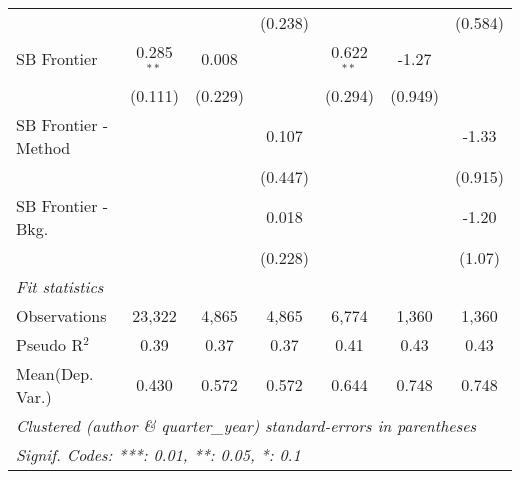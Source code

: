\begin{tabular}{lcccccc}
                        &              &         & (0.238)     &              &         & (0.584)\\   
   SB Frontier          & 0.285$^{**}$ & 0.008   &             & 0.622$^{**}$ & -1.27   &   \\   
                        & (0.111)      & (0.229) &             & (0.294)      & (0.949) &   \\   
   SB Frontier - Method &              &         & 0.107       &              &         & -1.33\\   
                        &              &         & (0.447)     &              &         & (0.915)\\   
   SB Frontier - Bkg.   &              &         & 0.018       &              &         & -1.20\\   
                        &              &         & (0.228)     &              &         & (1.07)\\   
   \midrule
   \emph{Fit statistics}\\
   Observations         & 23,322       & 4,865   & 4,865       & 6,774        & 1,360   & 1,360\\  
   Pseudo R$^2$         & 0.39         & 0.37    & 0.37        & 0.41         & 0.43    & 0.43\\  
Mean(Dep. Var.) & 0.430 & 0.572 & 0.572 & 0.644 & 0.748 & 0.748 \\
   \midrule \midrule
   \multicolumn{7}{l}{\emph{Clustered (author \& quarter\_year) standard-errors in parentheses}}\\
   \multicolumn{7}{l}{\emph{Signif. Codes: ***: 0.01, **: 0.05, *: 0.1}}\\
\end{tabular}
\par\endgroup
